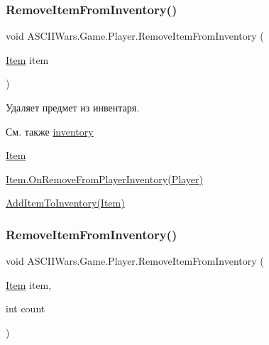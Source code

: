 \subsubsection{\texorpdfstring{Remove\+Item\+From\+Inventory()}{RemoveItemFromInventory()}\hspace{0.1cm}{\footnotesize\ttfamily [1/2]}}
{\footnotesize\ttfamily void A\+S\+C\+I\+I\+Wars.\+Game.\+Player.\+Remove\+Item\+From\+Inventory (\begin{DoxyParamCaption}\item[{\hyperlink{class_a_s_c_i_i_wars_1_1_game_1_1_item}{Item}}]{item }\end{DoxyParamCaption})\hspace{0.3cm}{\ttfamily [inline]}}



Удаляет предмет из инвентаря. 

\begin{DoxySeeAlso}{См. также}
\hyperlink{class_a_s_c_i_i_wars_1_1_game_1_1_player_a04acfaa196162f89bfae7aee5ec45480}{inventory} 

\hyperlink{class_a_s_c_i_i_wars_1_1_game_1_1_item}{Item} 

\hyperlink{class_a_s_c_i_i_wars_1_1_game_1_1_item_a52412546f837bfc65a3aa9d728fa142f}{Item.\+On\+Remove\+From\+Player\+Inventory(\+Player)} 

\hyperlink{class_a_s_c_i_i_wars_1_1_game_1_1_player_a51054cd802e781a9f0a018f893ec3877}{Add\+Item\+To\+Inventory(\+Item)} 
\end{DoxySeeAlso}
\hypertarget{class_a_s_c_i_i_wars_1_1_game_1_1_player_acef087ca862c4f210d7d049a2b09b29f}{}\label{class_a_s_c_i_i_wars_1_1_game_1_1_player_acef087ca862c4f210d7d049a2b09b29f} 
\subsubsection{\texorpdfstring{Remove\+Item\+From\+Inventory()}{RemoveItemFromInventory()}\hspace{0.1cm}{\footnotesize\ttfamily [2/2]}}
{\footnotesize\ttfamily void A\+S\+C\+I\+I\+Wars.\+Game.\+Player.\+Remove\+Item\+From\+Inventory (\begin{DoxyParamCaption}\item[{\hyperlink{class_a_s_c_i_i_wars_1_1_game_1_1_item}{Item}}]{item,  }\item[{int}]{count }\end{DoxyParamCaption})\hspace{0.3cm}{\ttfamily [inline]}}

